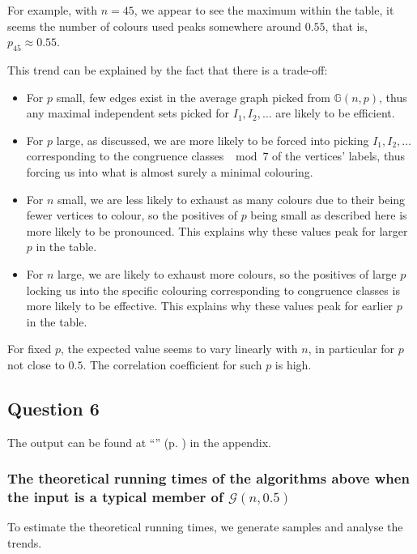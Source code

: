 \documentclass{article}
\newcommand{\namepageref}[1]{``\nameref{#1}'' (p. \pageref{#1})}
\begin{document}
For example, with $n=45$, we appear to see the maximum within the table, it seems the number of colours used peaks somewhere around $0.55$, that is, $p_{45} \approx 0.55$.

This trend can be explained by the fact that there is a trade-off:

\begin{itemize}
	\item For $p$ small, few edges exist in the average graph picked from $\mathbb{G}(n,p)$, thus any maximal independent sets picked for $I_1, I_2, \dots$ are likely to be efficient.
	\item For $p$ large, as discussed, we are more likely to be forced into picking $I_1, I_2, \dots$ corresponding to the congruence classes $\mod 7$ of the vertices' labels, thus forcing us into what is almost surely a minimal colouring.
	\item For $n$ small, we are less likely to exhaust as many colours due to their being fewer vertices to colour, so the positives of $p$ being small as described here is more likely to be pronounced. This explains why these values peak for larger $p$ in the table.
	\item For $n$ large, we are likely to exhaust more colours, so the positives of large $p$ locking us into the specific colouring corresponding to congruence classes is more likely to be effective. This explains why these values peak for earlier $p$ in the table.
\end{itemize}

For fixed $p$, the expected value seems to vary linearly with $n$, in particular for $p$ not close to $0.5$. The correlation coefficient for such $p$ is high.

\newpage

\subsection{Question 6}

The output can be found at \namepageref{output_question_6} in the appendix.

\subsubsection{The theoretical running times of the algorithms above when the input is a typical member of $\mathcal{G}(n,0.5)$}



To estimate the theoretical running times, we generate samples and analyse the trends.
\end{document}
